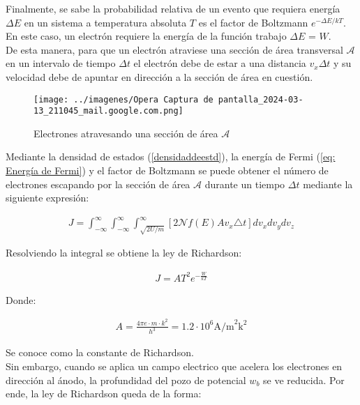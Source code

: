 \documentclass[%
 reprint,
 amsmath,amssymb,
 aps,
]{revtex4-2}
\begin{document}
Finalmente, se sabe  la probabilidad relativa de un evento que requiera energía $\Delta E$ en un sistema a temperatura absoluta $T$ es el factor de Boltzmann $e^{-\Delta E/kT}$. En este caso, un electrón requiere la energía de la función trabajo $\Delta E$ = $W$. 
\\

De esta manera, para que un electrón atraviese una sección de área transversal $\mathcal{A}$ en un intervalo de tiempo $\Delta t$ el electrón debe de estar a una distancia $v_{x}\Delta t$ y su velocidad debe de apuntar en dirección a la sección de área en cuestión.
\\

\begin{figure}[H]
    \centering
    \texttt{[image: ../imagenes/Opera Captura de pantalla\_2024-03-13\_211045\_mail.google.com.png]}
    \caption{Electrones atravesando una sección de área $\mathcal{A}$}
    \label{fig:4}
\end{figure}

Mediante la densidad de estados (\ref{densidaddeestd}), la energía de Fermi (\ref{eq: Energía de Fermi}) y el factor de Boltzmann se puede obtener el número de electrones escapando por la sección de área $\mathcal{A}$ durante un tiempo $\Delta t$ mediante la siguiente expresión:

\begin{align*}
    J= \int_{-\infty}^{\infty} \int_{-\infty}^{\infty} \int_{\sqrt{2U/m}}^{\infty}\left[2\mathcal{N}f(E)Av_{x}\triangle t \right] dv_{x}dv_{y}dv_{z}
\end{align*}

\vspace{0.2 cm}
Resolviendo la integral se obtiene la ley de Richardson:

\begin{align*}
    J = AT^{2}e^{-\frac{W}{kT}}
\end{align*}

\vspace{0.2 cm}
Donde:

\begin{align*}
    A = \frac{4\pi e\cdot m \cdot k^{2}}{h^{3}} = 1.2\cdot 10^{6} \text{A/m}^{2}\text{k}^{2}
\end{align*}

\vspace{0.2 cm}
 Se conoce como la constante de Richardson.
\\

Sin embargo, cuando se aplica un campo electrico que acelera los electrones en dirección al ánodo, la profundidad del pozo de potencial $w_b$ se ve reducida. Por ende, la ley de Richardson queda de la forma:
\end{document}
